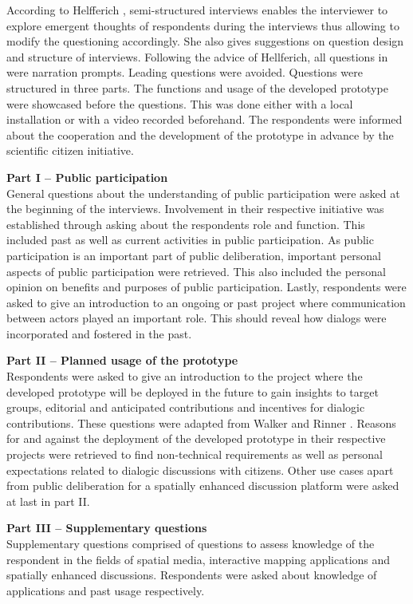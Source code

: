 According to Helfferich \cite{helfferich2005}, semi-structured interviews enables the interviewer to explore emergent thoughts of respondents during the interviews thus allowing to modify the questioning accordingly. She also gives suggestions on question design and structure of interviews. Following the advice of Hellferich, all questions in were narration prompts. Leading questions were avoided. Questions were structured in three parts. The functions and usage of the developed prototype were showcased before the questions. This was done either with a local installation or with a video recorded beforehand. The respondents were informed about the cooperation and the development of the prototype in advance by the scientific citizen initiative.

\textbf{Part I -- Public participation}\\
General questions about the understanding of public participation were asked at the beginning of the interviews. Involvement in their respective initiative was established through asking about the respondents role and function. This included past as well as current activities in public participation. As public participation is an important part of public deliberation, important personal aspects of public participation were retrieved. This also included the personal opinion on benefits and purposes of public participation. Lastly, respondents were asked to give an introduction to an ongoing or past project where communication between actors played an important role. This should reveal how dialogs were incorporated and fostered in the past.

\textbf{Part II -- Planned usage of the prototype}\\
Respondents were asked to give an introduction to the project where the developed prototype will be deployed in the future to gain insights to target groups, editorial and anticipated contributions and incentives for dialogic contributions. These questions were adapted from Walker and Rinner \cite{Walker2013Qualitative}. Reasons for and against the deployment of the developed prototype in their respective projects were retrieved to find non-technical requirements as well as personal expectations related to dialogic discussions with citizens. Other use cases apart from public deliberation for a spatially enhanced discussion platform were asked at last in part II.

\textbf{Part III -- Supplementary questions}\\
Supplementary questions comprised of questions to assess knowledge of the respondent in the fields of spatial media, interactive mapping applications and spatially enhanced discussions. Respondents were asked about knowledge of applications and past usage respectively.

